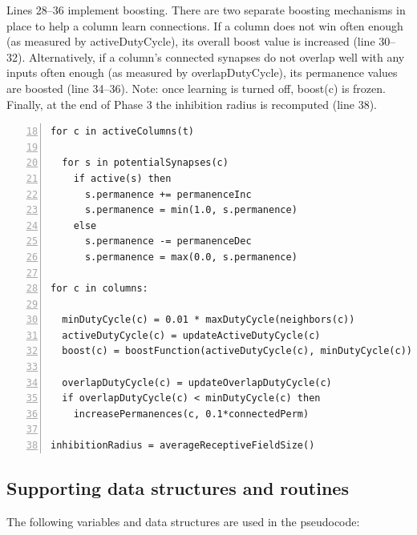 \documentclass{report}
\begin{document}
Lines 28--36 implement boosting. There are two separate boosting
mechanisms in place to help a column learn connections. If a column
does not win often enough (as measured by activeDutyCycle), its
overall boost value is increased (line 30--32). Alternatively, if a
column's connected synapses do not overlap well with any inputs often
enough (as measured by overlapDutyCycle), its permanence values are
boosted (line 34--36). Note: once learning is turned off, boost(c) is
frozen.  Finally, at the end of Phase 3 the inhibition radius is
recomputed (line 38).

\begin{lstlisting}[numbers=left,firstnumber=18]
for c in activeColumns(t)

  for s in potentialSynapses(c)
    if active(s) then
      s.permanence += permanenceInc
      s.permanence = min(1.0, s.permanence)
    else
      s.permanence -= permanenceDec
      s.permanence = max(0.0, s.permanence)

for c in columns:

  minDutyCycle(c) = 0.01 * maxDutyCycle(neighbors(c))
  activeDutyCycle(c) = updateActiveDutyCycle(c)
  boost(c) = boostFunction(activeDutyCycle(c), minDutyCycle(c))

  overlapDutyCycle(c) = updateOverlapDutyCycle(c)
  if overlapDutyCycle(c) < minDutyCycle(c) then
    increasePermanences(c, 0.1*connectedPerm)

inhibitionRadius = averageReceptiveFieldSize()

\end{lstlisting}

\subsection*{Supporting data structures and routines}

The following variables and data structures are used in the pseudocode:
\end{document}
